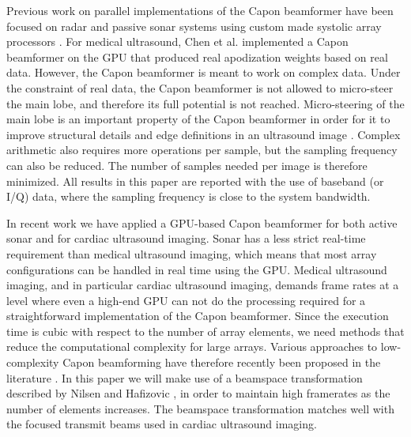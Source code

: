 \documentclass[journal]{IEEEtran}
\begin{document}
Previous work on parallel implementations of the Capon beamformer have been focused on radar and passive sonar systems using custom made systolic array processors \cite{McWhirter1989, Moonen1993, Sinha2002}. For medical ultrasound, Chen et al. \cite{Chen2011a, Chen2011, Chen} implemented a Capon beamformer on the GPU that produced real apodization weights based on real data. However, the Capon beamformer is meant to work on complex data. Under the constraint of real data, the Capon beamformer is not allowed to micro-steer the main lobe, and therefore its full potential is not reached. Micro-steering of the main lobe is an important property of the Capon beamformer in order for it to improve structural details and edge definitions in an ultrasound image \cite[Fig 9.]{Synnevag2009}. Complex arithmetic also requires more operations per sample, but the sampling frequency can also be reduced. The number of samples needed per image is therefore minimized. All results in this paper are reported with the use of baseband (or I/Q) data, where the sampling frequency is close to the system bandwidth. 


In recent work \cite{asen2012, Buskenes} we have applied a GPU-based Capon beamformer for both active sonar and for cardiac ultrasound imaging. Sonar has a less strict real-time requirement than medical ultrasound imaging, which means that most array configurations can be handled in real time using the GPU. Medical ultrasound imaging, and in particular cardiac ultrasound imaging, demands frame rates at a level where even a high-end GPU can not do the processing required for a straightforward implementation of the Capon beamformer. Since the execution time is cubic with respect to the number of array elements, we need methods that reduce the computational complexity for large arrays. Various approaches to low-complexity Capon beamforming have therefore recently been proposed in the literature \cite{Synnevag2011, Asl2012, Jensen2012, Kim}. In this paper we will make use of a beamspace transformation described by Nilsen and Hafizovic \cite{Nilsen2009}, in order to maintain high framerates as the number of elements increases. The beamspace transformation matches well with the focused transmit beams used in cardiac ultrasound imaging. 
\end{document}
